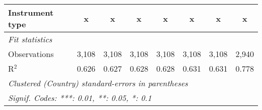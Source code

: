 \begin{table}[htbp]
\begin{tabular}{lccccccc}
      Instrument type                                                        & x             & x             & x             & x             & x             & x             & x\\  
      \midrule \emph{Fit statistics}\\
      Observations                                                           & 3,108         & 3,108         & 3,108         & 3,108         & 3,108         & 3,108         & 2,940\\  
      R$^2$                                                                  & 0.626         & 0.627         & 0.628         & 0.628         & 0.631         & 0.631         & 0.778\\  
      \midrule
      \multicolumn{8}{l}{\emph{Clustered (Country) standard-errors in parentheses}}\\
      \multicolumn{8}{l}{\emph{Signif. Codes: ***: 0.01, **: 0.05, *: 0.1}}\\
   \end{tabular}
\end{table}


